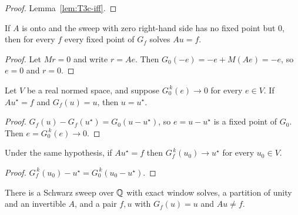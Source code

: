 \begin{proof}
  \leanok
  Lemma~\ref{lem:T3c-iff}.
\end{proof}

\begin{corollary}\label{cor:T3c-homogeneous}
  \leanok
  If $A$ is onto and the sweep with zero right-hand side has no fixed point but
  $0$, then for every $f$ every fixed point of $G_f$ solves $Au=f$.
\end{corollary}

\begin{proof}
  \leanok
  Let $Mr=0$ and write $r=Ae$.  Then $G_0(-e)=-e+M(Ae)=-e$, so $e=0$ and
  $r=0$.
\end{proof}

\begin{theorem}\label{thm:T3c-unique}
  \leanok
  Let $V$ be a real normed space, and suppose $G_0^{\,k}(e)\to0$ for every
  $e\in V$.  If $Au^\star=f$ and $G_f(u)=u$, then $u=u^\star$.
\end{theorem}

\begin{proof}
  \leanok
  $G_f(u)-G_f(u^\star)=G_0(u-u^\star)$, so $e=u-u^\star$ is a fixed point of
  $G_0$.  Then $e=G_0^{\,k}(e)\to0$.
\end{proof}

\begin{theorem}\label{thm:T3c-tendsto}
  \leanok
  Under the same hypothesis, if $Au^\star=f$ then $G_f^{\,k}(u_0)\to u^\star$
  for every $u_0\in V$.
\end{theorem}

\begin{proof}
  \leanok
  $G_f^{\,k}(u_0)-u^\star=G_0^{\,k}(u_0-u^\star)$.
\end{proof}

\begin{theorem}\label{thm:T3c-counterexample}
  \leanok
  There is a Schwarz sweep over $\mathbb{Q}$ with exact window solves, a partition of
  unity and an invertible $A$, and a pair $f,u$ with $G_f(u)=u$ and $Au\ne f$.
\end{theorem}

